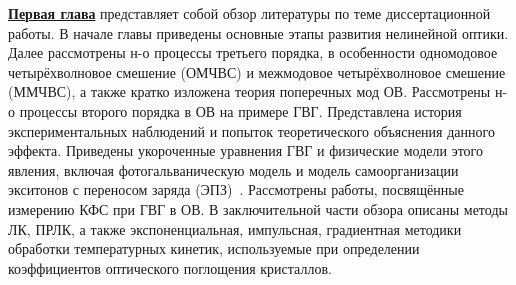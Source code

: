 \underline{\textbf{Первая глава}} представляет собой обзор литературы по теме диссертационной работы. В начале главы приведены основные этапы развития нелинейной оптики. Далее рассмотрены н-о процессы третьего порядка, в особенности одномодовое четырёхволновое смешение (ОМЧВС) и межмодовое четырёхволновое смешение (ММЧВС), а также кратко изложена теория поперечных мод ОВ. Рассмотрены н-о процессы второго порядка в ОВ на примере ГВГ. Представлена история экспериментальных наблюдений и попыток теоретического объяснения данного эффекта. Приведены укороченные уравнения ГВГ и физические модели этого явления, включая фотогальваническую модель и модель самоорганизации экситонов с переносом заряда (ЭПЗ)~\cite{dianov1995photoinduced, antonyuk2001self}. Рассмотрены работы, посвящённые измерению КФС при ГВГ в ОВ. В заключительной части обзора описаны методы ЛК, ПРЛК, а также экспоненциальная, импульсная, градиентная методики обработки температурных кинетик, используемые при определении коэффициентов оптического поглощения кристаллов.